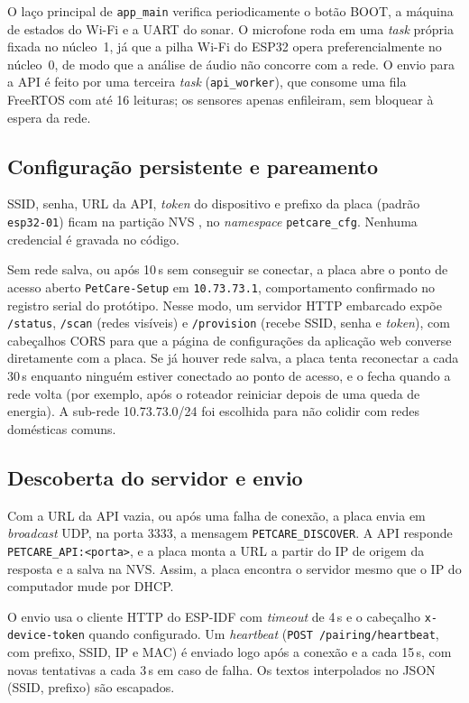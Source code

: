 O laço principal de \texttt{app\_main} verifica periodicamente o botão BOOT, a máquina de estados do Wi-Fi e a UART do sonar. O microfone roda em uma \textit{task} própria fixada no núcleo~1, já que a pilha Wi-Fi do ESP32 opera preferencialmente no núcleo~0, de modo que a análise de áudio não concorre com a rede. O envio para a API é feito por uma terceira \textit{task} (\texttt{api\_worker}), que consome uma fila FreeRTOS com até 16 leituras; os sensores apenas enfileiram, sem bloquear à espera da rede.

\subsection{Configuração persistente e pareamento}

SSID, senha, URL da API, \textit{token} do dispositivo e prefixo da placa (padrão \texttt{esp32-01}) ficam na partição NVS \citep{espidfnvs}, no \textit{namespace} \texttt{petcare\_cfg}. Nenhuma credencial é gravada no código.

Sem rede salva, ou após 10\,s sem conseguir se conectar, a placa abre o ponto de acesso aberto \texttt{PetCare-Setup} em \texttt{10.73.73.1}, comportamento confirmado no registro serial do protótipo. Nesse modo, um servidor HTTP embarcado expõe \texttt{/status}, \texttt{/scan} (redes visíveis) e \texttt{/provision} (recebe SSID, senha e \textit{token}), com cabeçalhos CORS para que a página de configurações da aplicação web converse diretamente com a placa. Se já houver rede salva, a placa tenta reconectar a cada 30\,s enquanto ninguém estiver conectado ao ponto de acesso, e o fecha quando a rede volta (por exemplo, após o roteador reiniciar depois de uma queda de energia). A sub-rede 10.73.73.0/24 foi escolhida para não colidir com redes domésticas comuns.

\subsection{Descoberta do servidor e envio}

Com a URL da API vazia, ou após uma falha de conexão, a placa envia em \textit{broadcast} UDP, na porta 3333, a mensagem \texttt{PETCARE\_DISCOVER}. A API responde \texttt{PETCARE\_API:<porta>}, e a placa monta a URL a partir do IP de origem da resposta e a salva na NVS. Assim, a placa encontra o servidor mesmo que o IP do computador mude por DHCP.

O envio usa o cliente HTTP do ESP-IDF com \textit{timeout} de 4\,s e o cabeçalho \texttt{x-device-token} quando configurado. Um \textit{heartbeat} (\texttt{POST /pairing/heartbeat}, com prefixo, SSID, IP e MAC) é enviado logo após a conexão e a cada 15\,s, com novas tentativas a cada 3\,s em caso de falha. Os textos interpolados no JSON (SSID, prefixo) são escapados.

